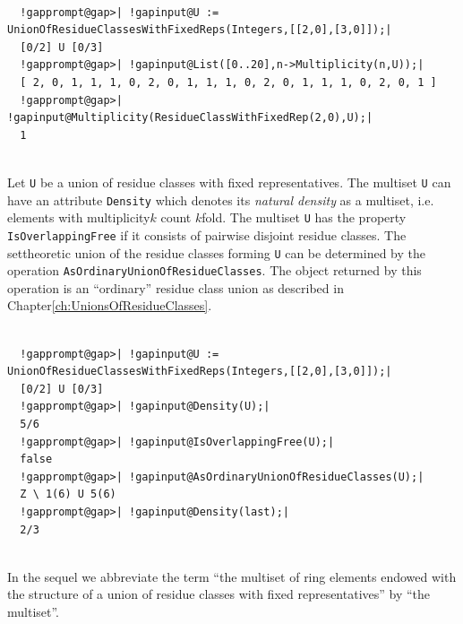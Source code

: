 \documentclass[a4paper,11pt]{report}
\begin{document}
{{{ 
\begin{Verbatim}[commandchars=!@|,fontsize=\small,frame=single,label=Example]
  
  !gapprompt@gap>| !gapinput@U := UnionOfResidueClassesWithFixedReps(Integers,[[2,0],[3,0]]);|
  [0/2] U [0/3]
  !gapprompt@gap>| !gapinput@List([0..20],n->Multiplicity(n,U));|
  [ 2, 0, 1, 1, 1, 0, 2, 0, 1, 1, 1, 0, 2, 0, 1, 1, 1, 0, 2, 0, 1 ]
  !gapprompt@gap>| !gapinput@Multiplicity(ResidueClassWithFixedRep(2,0),U);|
  1
  
\end{Verbatim}
 }

    Let \texttt{U} be a union of residue classes with fixed representatives. The multiset \texttt{U} can have an attribute \texttt{Density} which denotes its \emph{natural density} as a multiset, i.e. elements with multiplicity{\nobreakspace}$k$ count $k$\texttt{}fold. The multiset \texttt{U} has the property \texttt{IsOverlappingFree} if it consists of pairwise disjoint residue classes. The
set\texttt{}theoretic union of the residue classes forming \texttt{U} can be determined by the operation \texttt{AsOrdinaryUnionOfResidueClasses}. The object returned by this operation is an ``ordinary'' residue class union as described in Chapter{\nobreakspace}\ref{ch:UnionsOfResidueClasses}. 
\begin{Verbatim}[commandchars=!@|,fontsize=\small,frame=single,label=Example]
  
  !gapprompt@gap>| !gapinput@U := UnionOfResidueClassesWithFixedReps(Integers,[[2,0],[3,0]]);|
  [0/2] U [0/3]
  !gapprompt@gap>| !gapinput@Density(U);|
  5/6
  !gapprompt@gap>| !gapinput@IsOverlappingFree(U);|
  false
  !gapprompt@gap>| !gapinput@AsOrdinaryUnionOfResidueClasses(U);|
  Z \ 1(6) U 5(6)
  !gapprompt@gap>| !gapinput@Density(last);|
  2/3
  
\end{Verbatim}
 In the sequel we abbreviate the term ``the multiset of ring elements endowed with the structure of a union of residue
classes with fixed representatives'' by ``the multiset''. 

}}
\end{document}
